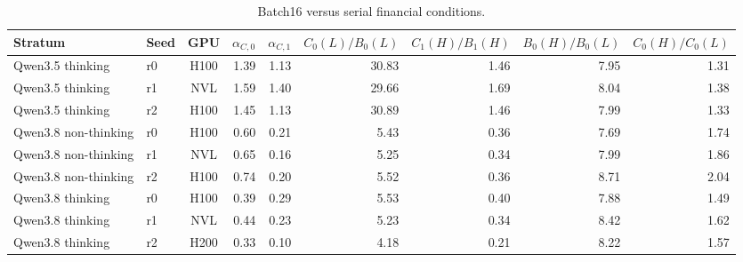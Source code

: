 
\begin{table}[t]
\caption{Batch16 versus serial financial conditions.}
\label{tab:service-financial}
\centering\small
\begin{tabular}{llcrrrrrr}
\toprule
Stratum & Seed & GPU & $\alpha_{C,0}$ & $\alpha_{C,1}$ & $C_0(L)/B_0(L)$ & $C_1(H)/B_1(H)$ & $B_0(H)/B_0(L)$ & $C_0(H)/C_0(L)$ \\
\midrule
Qwen3.5 thinking & r0 & H100 & 1.39 & 1.13 & 30.83 & 1.46 & 7.95 & 1.31 \\
Qwen3.5 thinking & r1 & NVL & 1.59 & 1.40 & 29.66 & 1.69 & 8.04 & 1.38 \\
Qwen3.5 thinking & r2 & H100 & 1.45 & 1.13 & 30.89 & 1.46 & 7.99 & 1.33 \\
Qwen3.8 non-thinking & r0 & H100 & 0.60 & 0.21 & 5.43 & 0.36 & 7.69 & 1.74 \\
Qwen3.8 non-thinking & r1 & NVL & 0.65 & 0.16 & 5.25 & 0.34 & 7.99 & 1.86 \\
Qwen3.8 non-thinking & r2 & H100 & 0.74 & 0.20 & 5.52 & 0.36 & 8.71 & 2.04 \\
Qwen3.8 thinking & r0 & H100 & 0.39 & 0.29 & 5.53 & 0.40 & 7.88 & 1.49 \\
Qwen3.8 thinking & r1 & NVL & 0.44 & 0.23 & 5.23 & 0.34 & 8.42 & 1.62 \\
Qwen3.8 thinking & r2 & H200 & 0.33 & 0.10 & 4.18 & 0.21 & 8.22 & 1.57 \\
\bottomrule
\end{tabular}
\end{table}
